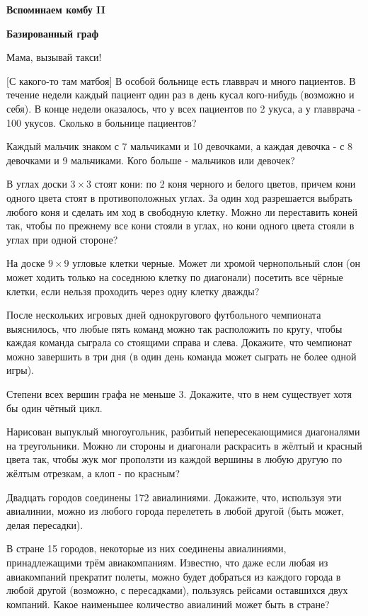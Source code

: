 \centerline{\bf \Huge Вспоминаем комбу II}
\centerline{\bf \Huge Базированный граф}

\begin{flushright}
        \scriptsize{Мама, вызывай такси!}
\end{flushright}

$\bigl[\textbf{С какого-то там матбоя}\bigr]$
В особой больнице есть главврач и много пациентов. В течение недели каждый пациент один раз в день кусал кого-нибудь (возможно и себя). В конце недели оказалось, что у всех пациентов по 2 укуса, а у главврача - 100 укусов. Сколько в больнице пациентов?

Каждый мальчик знаком с 7 мальчиками и 10 девочками, а каждая девочка - с 8 девочками и 9 мальчиками. Кого больше - мальчиков или девочек?

В углах доски $3 \times 3$ стоят кони: по 2 коня черного и белого цветов, причем кони одного цвета стоят в противоположных углах. За один ход разрешается выбрать любого коня и сделать им ход в свободную клетку. Можно ли переставить коней так, чтобы по прежнему все кони стояли в углах, но кони одного цвета стояли в углах при одной стороне?


На доске $9 \times 9$ угловые клетки черные. Может ли хромой чернопольный слон (он может ходить только на соседнюю клетку по диагонали) посетить все чёрные клетки, если нельзя проходить через одну клетку дважды?

После нескольких игровых дней однокругового футбольного чемпионата выяснилось, что любые пять команд можно так расположить по кругу, чтобы каждая команда сыграла со стоящими справа и слева. Докажите, что чемпионат можно завершить в три дня (в один день команда может сыграть не более одной игры).

Степени всех вершин графа не меньше 3. Докажите, что в нем существует хотя бы один чётный цикл.

 Нарисован выпуклый многоугольник, разбитый непересекающимися диагоналями на треугольники. Можно ли стороны и диагонали раскрасить в жёлтый и красный цвета так, чтобы жук мог проползти из каждой вершины в любую другую по жёлтым отрезкам, а клоп - по красным?

 Двадцать городов соединены 172 авиалиниями. Докажите, что, используя эти авиалинии, можно из любого города перелететь в любой другой (быть может, делая пересадки).

\newpage

\hspace{3mm}


 В стране 15 городов, некоторые из них соединены авиалиниями, принадлежащими трём авиакомпаниям. Известно, что даже если любая из авиакомпаний прекратит полеты, можно будет добраться из каждого города в любой другой (возможно, с пересадками), пользуясь рейсами оставшихся двух компаний. Какое наименьшее количество авиалиний может быть в стране?